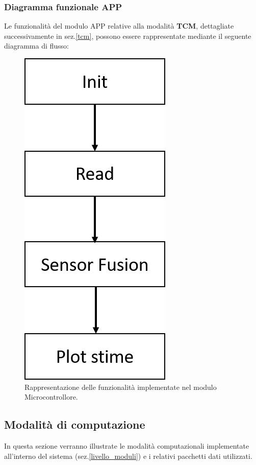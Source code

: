 \subsubsection{Diagramma funzionale APP}
Le funzionalità del modulo APP relative alla modalità \textbf{TCM}, dettagliate successivamente in sez.\ref{tcm}, possono essere rappresentate mediante il seguente diagramma di flusso:
\begin{figure}[H]  
	\centering 
	\includegraphics[scale=0.4]{implementazione/diagrammaApp.png}
	\caption{Rappresentazione delle funzionalità implementate nel modulo Microcontrollore.}
	\label{fig:diagrammaAPP}
\end{figure}

\subsection{Modalità di computazione}
\label{computationMode}
In questa sezione verranno illustrate le modalità computazionali implementate all'interno del sistema (sez.\ref{livello_moduli}) e i relativi pacchetti dati utilizzati.

